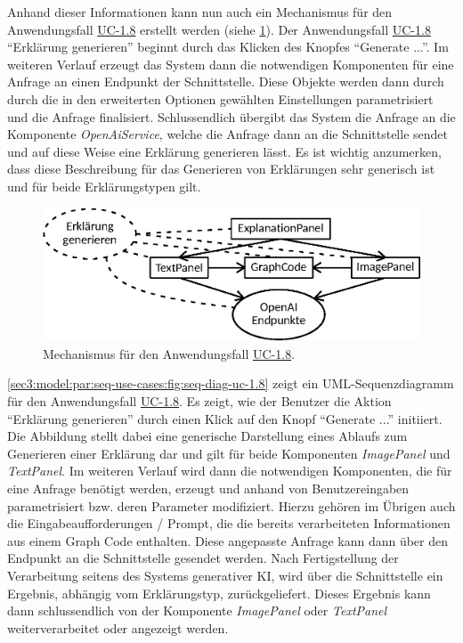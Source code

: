 Anhand dieser Informationen kann nun auch ein Mechanismus für den Anwendungsfall \hyperref[sec3:model:uc-1.8]{UC-1.8} erstellt werden (siehe \cref{sec3:model:par:mechanism-use-cases:fig:mech-uc-1.8}).
Der Anwendungsfall \hyperref[sec3:model:uc-1.8]{UC-1.8} \enquote{Erklärung generieren} beginnt durch das Klicken des Knopfes \enquote{Generate ...}.
Im weiteren Verlauf erzeugt das System dann die notwendigen Komponenten für eine Anfrage an einen Endpunkt der Schnittstelle.
Diese Objekte werden dann durch durch die in den erweiterten Optionen gewählten Einstellungen parametrisiert und die Anfrage finalisiert.
Schlussendlich übergibt das System die Anfrage an die Komponente \textit{OpenAiService}, welche die Anfrage dann an die Schnittstelle sendet und auf diese Weise eine Erklärung generieren lässt.
Es ist wichtig anzumerken, dass diese Beschreibung für das Generieren von Erklärungen sehr generisch ist und für beide Erklärungstypen gilt.

\begin{figure}[htb]
    \centering
    \includegraphics{chapter/chapter_3/mechanisms/mechanism-uc-1.8.eps}
    \caption{Mechanismus für den Anwendungsfall \hyperref[sec3:model:uc-1.8]{UC-1.8}.}
    \label{sec3:model:par:mechanism-use-cases:fig:mech-uc-1.8}
\end{figure}



\cref{sec3:model:par:seq-use-cases:fig:seq-diag-uc-1.8} zeigt ein UML-Sequenzdiagramm für den Anwendungsfall \hyperref[sec3:model:uc-1.8]{UC-1.8}.
Es zeigt, wie der Benutzer die Aktion \enquote{Erklärung generieren} durch einen Klick auf den Knopf \enquote{Generate ...} initiiert.
Die Abbildung stellt dabei eine generische Darstellung eines Ablaufs zum Generieren einer Erklärung dar und gilt für beide Komponenten \textit{ImagePanel} und \textit{TextPanel}.
Im weiteren Verlauf wird dann die notwendigen Komponenten, die für eine Anfrage benötigt werden, erzeugt und anhand von Benutzereingaben parametrisiert bzw. deren Parameter modifiziert.
Hierzu gehören im Übrigen auch die Eingabeaufforderungen / Prompt, die die bereits verarbeiteten Informationen aus einem Graph Code enthalten.
Diese angepasste Anfrage kann dann über den Endpunkt an die Schnittstelle gesendet werden.
Nach Fertigstellung der Verarbeitung seitens des Systems generativer KI, wird über die Schnittstelle ein Ergebnis, abhängig vom Erklärungstyp, zurückgeliefert.
Dieses Ergebnis kann dann schlussendlich von der Komponente \textit{ImagePanel} oder \textit{TextPanel} weiterverarbeitet oder angezeigt werden.

